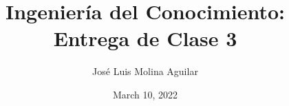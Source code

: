 \documentclass[11pt]{article}
\begin{document}
\title{ Ingeniería del Conocimiento: Entrega de Clase 3}
\author{José Luis Molina Aguilar\newline }
\date{March 10, 2022}


\begin{center}
\end{center}

\maketitle	
\end{document}
